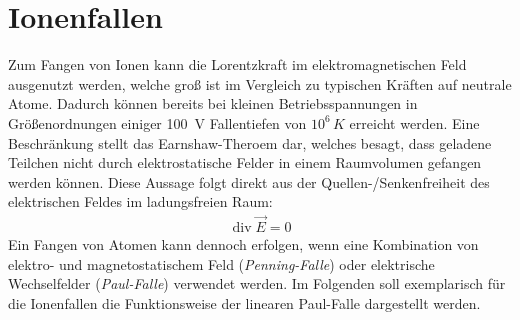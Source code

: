 \documentclass[twocolumn]{revtex4}
\DeclareMathOperator{\divergence}{div}
\begin{document}
\section{Ionenfallen}
Zum Fangen von Ionen kann die Lorentzkraft im elektromagnetischen Feld ausgenutzt werden, welche groß ist im Vergleich zu typischen Kräften auf neutrale Atome.
Dadurch können bereits bei kleinen Betriebsspannungen in Größenordnungen einiger \SI{100}{V} Fallentiefen von $10^6 \, \si{K}$ erreicht werden.
Eine Beschränkung stellt das Earnshaw-Theroem dar, welches besagt, dass geladene Teilchen nicht durch elektrostatische Felder in einem Raumvolumen gefangen werden können.
Diese Aussage folgt direkt aus der Quellen-/Senkenfreiheit des elektrischen Feldes im ladungsfreien Raum:
\begin{align}
	\divergence \vec{E} = 0
\end{align}
Ein Fangen von Atomen kann dennoch erfolgen, wenn eine Kombination von elektro- und magnetostatischem Feld (\emph{Penning-Falle}) oder elektrische Wechselfelder (\emph{Paul-Falle}) verwendet werden.
Im Folgenden soll exemplarisch für die Ionenfallen die Funktionsweise der linearen Paul-Falle dargestellt werden.
\end{document}

